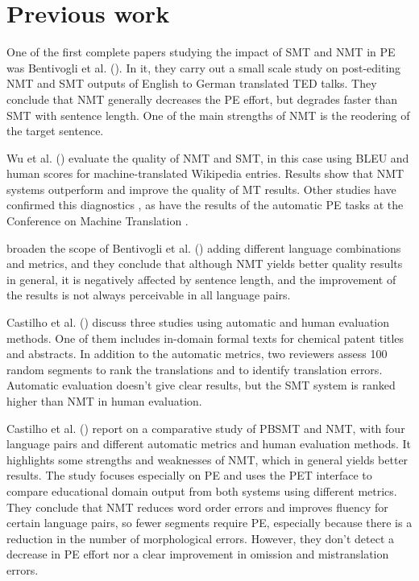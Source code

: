 \documentclass[output=paper]{langsci/langscibook}
\begin{document}
\section{Previous work} \label{Previouswork}
One of the first complete papers studying the impact of SMT and NMT in PE was Bentivogli et al. (\citeyear{Bentivogli2016}). In it, they carry out a small scale study on post-editing
NMT and SMT outputs of English to German translated TED talks. They conclude that NMT generally decreases the PE effort, but degrades faster than SMT with sentence length. One of the main strengths of NMT is the reodering of the target sentence.

Wu et al. (\citeyear{Wu2016GooglesTranslation}) evaluate the quality of NMT and SMT, in this case using BLEU \citep{Papineni2002} and human scores for machine-translated Wikipedia entries. Results show that NMT systems outperform and improve the quality of MT results. Other studies have confirmed this diagnostics \citep{Junczys,IsabelleCF17}, as have the results of the automatic PE tasks at the Conference on Machine Translation \citep{Bojar2016,Bojar2017}. 

\citet{Toral2017} broaden the scope of Bentivogli et al. (\citeyear{Bentivogli2016}) adding different language combinations and metrics, and they conclude that although NMT yields better quality results in general, it is negatively affected by sentence length, and the improvement of the results is not always perceivable in all language pairs. 

Castilho et al. (\citeyear{Castilho2017IsArt}) discuss three studies using automatic and human evaluation methods. One of them includes in-domain formal texts for chemical patent titles and abstracts. In addition to the automatic metrics, two reviewers assess 100 random segments to rank the translations and to identify translation errors. Automatic evaluation doesn't give clear results, but the SMT system is ranked higher than NMT in human evaluation.

Castilho et al. (\citeyear{Castillo2017}) report on a comparative study of PBSMT and NMT, with four language pairs and different automatic metrics and human evaluation methods. It highlights some strengths and weaknesses of NMT, which in general yields better results. The study focuses especially on PE and uses the PET interface \citep{Aziz} to compare educational domain output from both systems using different metrics. They conclude that NMT reduces word order errors and improves fluency for certain language pairs, so fewer segments require PE, especially because there is a reduction in the number of morphological errors. However, they don't detect a decrease in PE effort nor a clear improvement in omission and mistranslation errors.
\end{document}
